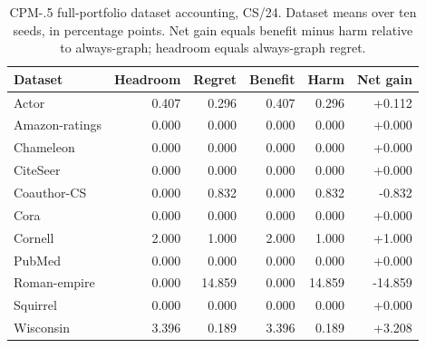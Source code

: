 \begin{table}[tbp]
\centering
\caption{CPM-.5 full-portfolio dataset accounting, CS/24. Dataset means over ten seeds, in percentage points. Net gain equals benefit minus harm relative to always-graph; headroom equals always-graph regret.}
\label{tab:cpm_account_CS_24}
\small
\setlength{\tabcolsep}{3pt}
\begin{tabular}{@{}lrrrrr@{}}
\toprule
Dataset & Headroom & Regret & Benefit & Harm & Net gain \\
\midrule
Actor & 0.407 & 0.296 & 0.407 & 0.296 & +0.112 \\
Amazon-ratings & 0.000 & 0.000 & 0.000 & 0.000 & +0.000 \\
Chameleon & 0.000 & 0.000 & 0.000 & 0.000 & +0.000 \\
CiteSeer & 0.000 & 0.000 & 0.000 & 0.000 & +0.000 \\
Coauthor-CS & 0.000 & 0.832 & 0.000 & 0.832 & -0.832 \\
Cora & 0.000 & 0.000 & 0.000 & 0.000 & +0.000 \\
Cornell & 2.000 & 1.000 & 2.000 & 1.000 & +1.000 \\
PubMed & 0.000 & 0.000 & 0.000 & 0.000 & +0.000 \\
Roman-empire & 0.000 & 14.859 & 0.000 & 14.859 & -14.859 \\
Squirrel & 0.000 & 0.000 & 0.000 & 0.000 & +0.000 \\
Wisconsin & 3.396 & 0.189 & 3.396 & 0.189 & +3.208 \\
\bottomrule
\end{tabular}
\end{table}

